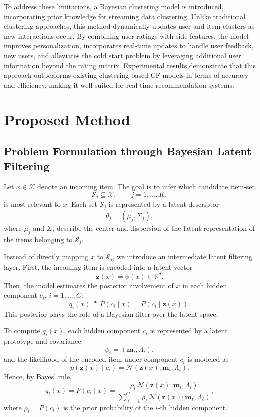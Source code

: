 \documentclass{article}
\begin{document}
To address these limitations, a Bayesian clustering model is introduced, incorporating prior knowledge for streaming data clustering. Unlike traditional clustering approaches, this method dynamically updates user and item clusters as new interactions occur. By combining user ratings with side features, the model improves personalization, incorporates real-time updates to handle user feedback, new users, and alleviates the cold start problem by leveraging additional user information beyond the rating matrix. Experimental results demonstrate that this approach outperforms existing clustering-based CF models in terms of accuracy and efficiency, making it well-suited for real-time recommendation systems. 









\section{Proposed Method}
\label{sec:proposed_method}




\subsection{Problem Formulation through Bayesian Latent Filtering}
\label{subsec:bayesian_latent_filtering}

Let \(x\in\mathcal{X}\) denote an incoming item. The goal is to infer which candidate item-set
\[
\mathcal{S}_j\subseteq\mathcal{X},\qquad j=1,\ldots,K,
\]
is most relevant to \(x\). Each set \(\mathcal{S}_j\) is represented by a latent descriptor
\[
\theta_j=(\mu_j,\Sigma_j),
\]
where \(\mu_j\) and \(\Sigma_j\) describe the center and dispersion of the latent representation of the items belonging to \(\mathcal{S}_j\).

Instead of directly mapping \(x\) to \(\mathcal{S}_j\), we introduce an intermediate latent filtering layer. First, the incoming item is encoded into a latent vector
\[
\mathbf{z}(x)=\phi(x)\in\mathbb{R}^{d}.
\]
Then, the model estimates the posterior involvement of \(x\) in each hidden component \(c_i\), \(i=1,\ldots,C\):
\[
q_i(x)
\triangleq
P(c_i\mid x)
=
P(c_i\mid \mathbf{z}(x)).
\]
This posterior plays the role of a Bayesian filter over the latent space.

To compute \(q_i(x)\), each hidden component \(c_i\) is represented by a latent prototype and covariance
\[
\psi_i=(\mathbf{m}_i,\Lambda_i),
\]
and the likelihood of the encoded item under component \(c_i\) is modeled as
\[
p(\mathbf{z}(x)\mid c_i)
=
\mathcal{N}\!\left(\mathbf{z}(x);\mathbf{m}_i,\Lambda_i\right).
\]
Hence, by Bayes' rule,
\[
q_i(x)
=
P(c_i\mid x)
=
\frac{
	\rho_i\,\mathcal{N}\!\left(\mathbf{z}(x);\mathbf{m}_i,\Lambda_i\right)
}{
	\sum_{\ell=1}^{C}
	\rho_\ell\,\mathcal{N}\!\left(\mathbf{z}(x);\mathbf{m}_\ell,\Lambda_\ell\right)
},
\]
where \(\rho_i=P(c_i)\) is the prior probability of the \(i\)-th hidden component.
\end{document}
